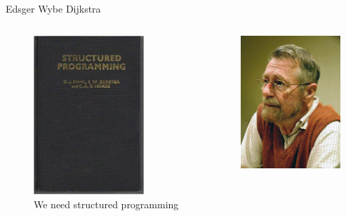 \documentclass[10pt]{beamer}
\begin{document}
\begin{frame}{Edsger Wybe Dijkstra}
    \begin{columns}
        \begin{column}{0.6\textwidth}
            \begin{figure}
    	        \includegraphics[height=6cm]{images/structured_programming.jpg}
	    	    \caption{We need structured programming}
            \end{figure}
        \end{column}
        \begin{column}{0.4\textwidth}  %
                \begin{center}
					\includegraphics[height=5cm]{images/dijstra.jpg}
                \end{center}
        \end{column}
    \end{columns}
\end{frame}
\end{document}
